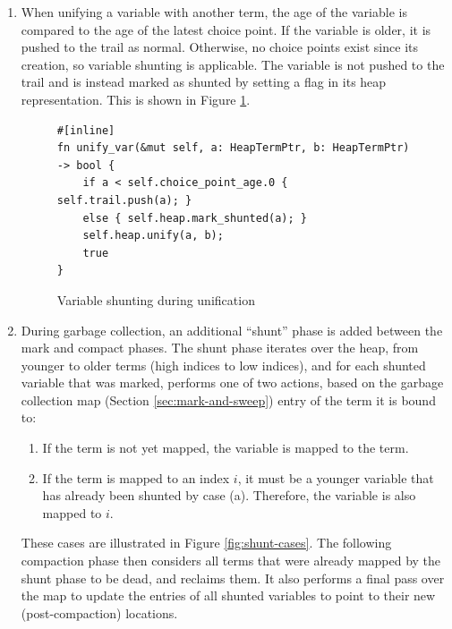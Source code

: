 \begin{enumerate}
\item When unifying a variable with another term, the age of the variable is compared to the age of the latest choice point. If the variable is older, it is pushed to the trail as normal. Otherwise, no choice points exist since its creation, so variable shunting is applicable. The variable is not pushed to the trail and is instead marked as shunted by setting a flag in its heap representation. This is shown in Figure \ref{fig:unify-var}.

\begin{figure}[H]
\centering
\begin{verbatim}
#[inline]
fn unify_var(&mut self, a: HeapTermPtr, b: HeapTermPtr) -> bool {
    if a < self.choice_point_age.0 { self.trail.push(a); }
    else { self.heap.mark_shunted(a); }
    self.heap.unify(a, b);
    true
}
\end{verbatim}
\caption{Variable shunting during unification}
\label{fig:unify-var}
\end{figure}

\item During garbage collection, an additional ``shunt'' phase is added between the mark and compact phases. The shunt phase iterates over the heap, from younger to older terms (high indices to low indices), and for each shunted variable that was marked, performs one of two actions, based on the garbage collection map (Section \ref{sec:mark-and-sweep}) entry of the term it is bound to:
\begin{enumerate}
\item If the term is not yet mapped, the variable is mapped to the term.
\item If the term is mapped to an index $i$, it must be a younger variable that has already been shunted by case (a). Therefore, the variable is also mapped to $i$.
\end{enumerate}

These cases are illustrated in Figure \ref{fig:shunt-cases}. The following compaction phase then considers all terms that were already mapped by the shunt phase to be dead, and reclaims them. It also performs a final pass over the map to update the entries of all shunted variables to point to their new (post-compaction) locations.

\begin{figure}[H]
\centering
{}
\end{figure}
\end{enumerate}

